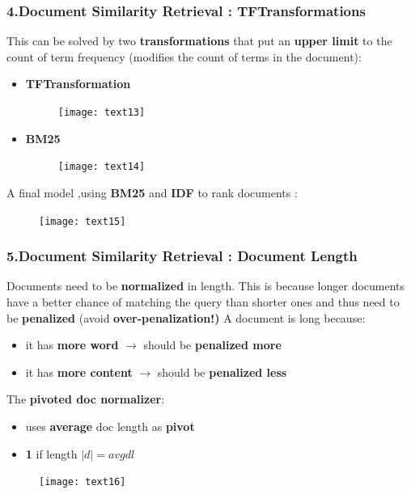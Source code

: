 \subsubsection{4.Document Similarity Retrieval : TFTransformations}
This can be solved by two \textbf{transformations} that put an \textbf{upper limit} to the count of term frequency (modifies the count of terms in the document):
\begin{itemize}
\item \textbf{TFTransformation}\\
\begin{figure}[H]
  \centering
  \texttt{[image: text13]}
\end{figure}

\item \textbf{BM25}\\
\begin{figure}[H]
  \centering
  \texttt{[image: text14]}
\end{figure}
\end{itemize}
A final model ,using \textbf{BM25} and \textbf{IDF} to rank documents :
\begin{figure}[H]
  \centering
  \texttt{[image: text15]}
\end{figure}

\subsubsection{5.Document Similarity Retrieval : Document Length}
Documents need to be \textbf{normalized} in length. This is because longer documents have a better chance of matching the query than shorter ones and thus need to be \textbf{penalized} (avoid \textbf{over-penalization!)}
A document is long because:
\begin{itemize}
\item it has \textbf{more word} $\rightarrow$ should be \textbf{penalized more}
\item it has \textbf{more content} $\rightarrow$ should be \textbf{penalized less}
\end{itemize}
The \textbf{pivoted doc normalizer}:
\begin{itemize}
\item uses \textbf{average} doc length as \textbf{pivot}
\item \textbf{1} if length $|d| = avgdl$
\end{itemize}
\begin{figure}[H]
  \centering
  \texttt{[image: text16]}
\end{figure}

